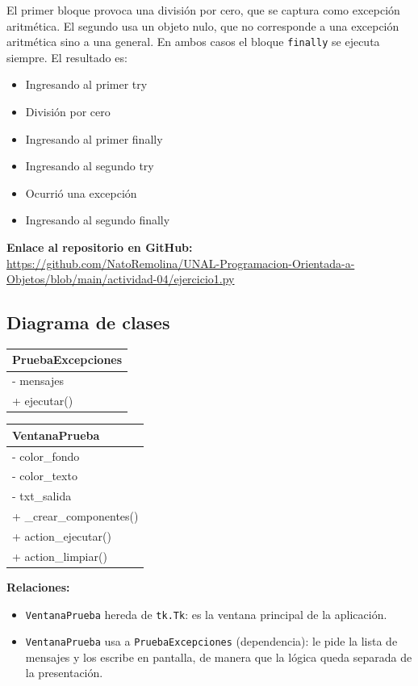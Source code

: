 \documentclass[11pt, a4paper]{article}
\newcommand{\clasebox}[3]{%
\begin{center}
\begin{tabular}{|l|}
\hline
\textbf{#1} \\
\hline
#2
\hline
#3
\hline
\end{tabular}
\end{center}
}
\begin{document}
\medskip
\noindent El primer bloque provoca una división por cero, que se captura como excepción
aritmética. El segundo usa un objeto nulo, que no corresponde a una excepción aritmética sino a
una general. En ambos casos el bloque \texttt{finally} se ejecuta siempre. El resultado es:

\begin{itemize}
    \item Ingresando al primer try
    \item División por cero
    \item Ingresando al primer finally
    \item Ingresando al segundo try
    \item Ocurrió una excepción
    \item Ingresando al segundo finally
\end{itemize}

\noindent \textbf{Enlace al repositorio en GitHub:} \\
\url{https://github.com/NatoRemolina/UNAL-Programacion-Orientada-a-Objetos/blob/main/actividad-04/ejercicio1.py}

\subsection{Diagrama de clases}
\clasebox{PruebaExcepciones}
{%
- mensajes \\
}
{%
+ ejecutar() \\
}

\clasebox{VentanaPrueba}
{%
- color\_fondo \\
- color\_texto \\
- txt\_salida \\
}
{%
+ \_crear\_componentes() \\
+ action\_ejecutar() \\
+ action\_limpiar() \\
}

\noindent \textbf{Relaciones:}
\begin{itemize}
    \item \texttt{VentanaPrueba} hereda de \texttt{tk.Tk}: es la ventana principal de la aplicación.
    \item \texttt{VentanaPrueba} usa a \texttt{PruebaExcepciones} (dependencia): le pide la lista de mensajes y los escribe en pantalla, de manera que la lógica queda separada de la presentación.
\end{itemize}
\end{document}
